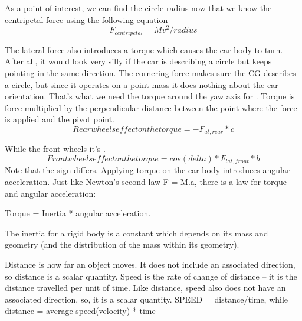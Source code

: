 \documentclass{book}
\begin{document}
As a point of interest, we can find the circle radius now that we know the centripetal force using the following equation
\begin{equation}
   F_{centripetal} = M v^2 / radius
\end{equation}

The lateral force also introduces a torque which causes the car body to turn.  After all, it would look very silly if the car is describing a circle but keeps pointing in the same direction.  The cornering force makes sure the CG describes a circle, but since it operates on a point mass it does nothing about the car orientation. That's what we need the torque around the yaw axis for \cite{van2003collision}.
Torque is force multiplied by the perpendicular distance between the point where the force is applied and the pivot point.
\begin{equation}
Rear wheels effect on the torque = -F_{at, rear} * c
\end{equation}

 While the front wheels it's .
\begin{equation}
 Front wheels effect on the torque = cos(delta) * F_{lat, front} * b
\end{equation}
 Note that the sign differs.
Applying torque on the car body introduces angular acceleration.  Just like Newton's second law F = M.a, there is a law for torque and angular acceleration:

Torque = Inertia * angular acceleration.

The inertia for a rigid body is a constant which depends on its mass and geometry (and the distribution of the mass within its geometry).

Distance is how far an object moves. It does not include an associated direction, so distance is a scalar quantity.
Speed is the rate of change of distance – it is the distance travelled per unit of time. Like distance, speed also does not have an associated direction, so, it is a scalar quantity.
SPEED = distance/time, while distance = average speed(velocity) * time
\end{document}

